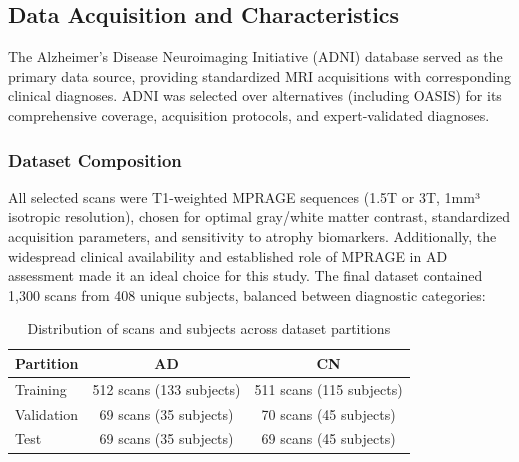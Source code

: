 \documentclass[12pt, a4paper]{article}
\begin{document}



\subsection{Data Acquisition and Characteristics}

The Alzheimer's Disease Neuroimaging Initiative (ADNI) database served as the primary data source, providing standardized MRI acquisitions with corresponding clinical diagnoses. ADNI was selected over alternatives (including OASIS) for its comprehensive coverage, acquisition protocols, and expert-validated diagnoses.

\subsubsection{Dataset Composition}

All selected scans were T1-weighted MPRAGE sequences (1.5T or 3T, 1mm³ isotropic resolution), chosen for optimal gray/white matter contrast, standardized acquisition parameters, and sensitivity to atrophy biomarkers. Additionally, the widespread clinical availability and established role of MPRAGE in AD assessment made it an ideal choice for this study. The final dataset contained 1,300 scans from 408 unique subjects, balanced between diagnostic categories:

\begin{table}[h]
\centering
\begin{tabular}{|l|c|c|}
\hline
\textbf{Partition} & \textbf{AD} & \textbf{CN} \\
\hline
Training & 512 scans (133 subjects) & 511 scans (115 subjects) \\
Validation & 69 scans (35 subjects) & 70 scans (45 subjects) \\
Test & 69 scans (35 subjects) & 69 scans (45 subjects) \\
\hline
\end{tabular}
\caption{Distribution of scans and subjects across dataset partitions}
\end{table}
\end{document}
